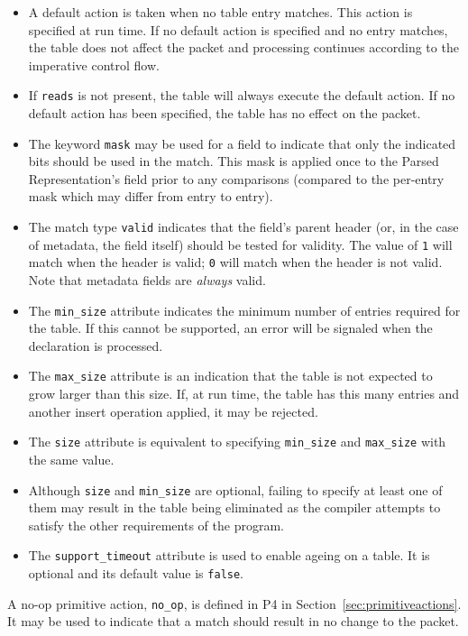 \documentclass[12pt]{article}
\begin{document}
\begin{itemize}
\item
A default action is taken when no table entry matches.  This action is specified 
at run time. If no default action is specified and no entry matches, the table 
does not affect the packet and processing continues according to the imperative 
control flow.
\item
If \texttt{reads} is not present, the table will always execute the default action. 
If no default action has been specified, the table has no effect on the packet.
\item
The keyword \texttt{mask} may be used for a field to indicate that only the indicated 
bits should be used in the match. This mask is applied once to the Parsed 
Representation's field prior to any comparisons (compared to the per-entry 
mask which may differ from entry to entry).
\item
The match type \texttt{valid} indicates that the field's parent header (or, in the 
case of metadata, the field itself) should be tested for validity.  The value 
of \texttt{1} will match when the header is valid; \texttt{0} will match when the header is 
not valid. Note that metadata fields 
are \textit{always} valid.
\item
The \texttt{min_size} attribute indicates the minimum number of entries required 
for the table. If this cannot be supported, an error will be signaled when 
the declaration is processed.
\item
The \texttt{max_size} attribute is an indication that the table is not expected to 
grow larger than this size. If, at run time, the table has this many entries 
and another insert operation applied, it may be rejected.
\item
The \texttt{size} attribute is equivalent to specifying \texttt{min_size} and \texttt{max_size} with 
the same value.
\item
Although \texttt{size} and \texttt{min_size} are optional, failing to specify at least one 
of them may result in the table being eliminated as the compiler attempts 
to satisfy the other requirements of the program.
\item
The \texttt{support_timeout} attribute is used to enable ageing on a table. It
is optional and its default value is \texttt{false}.
\end{itemize}


A no-op primitive action, \texttt{no_op}, is defined in P4 in 
Section~\ref{sec:primitiveactions}. It may be used to indicate that 
a match should result in no change to the packet.
\end{document}
